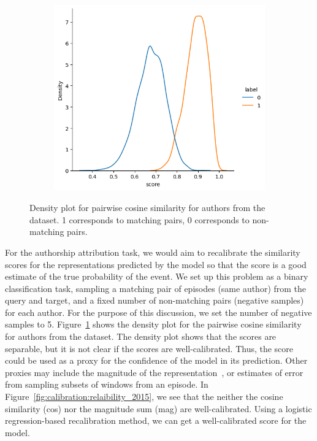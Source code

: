 \begin{figure}[h]
    \centering
    \begin{subfigure}{0.48\linewidth}
    \centering
    \includegraphics[width=\linewidth,alt={Density plot for calibration experiments.}]{stylometryExtensions/figures/calibration_expts/cos_dist_2015.png}
    \end{subfigure} %
    \caption{Density plot for pairwise cosine similarity for authors from the \DSvarydelta{} dataset. 1 corresponds to matching pairs, 0 corresponds to non-matching pairs.}
    \label{fig:calibration:density}
\end{figure}
For the authorship attribution task, we would aim to recalibrate the similarity scores for the representations predicted by the model so that the score is a good estimate of the true probability of the event.
We set up this problem as a binary classification task, sampling a matching pair of episodes (same author) from the query and target, and a fixed number of non-matching pairs (negative samples) for each author.
For the purpose of this discussion, we set the number of negative samples to 5.
Figure~\ref{fig:calibration:density} shows the density plot for the pairwise cosine similarity for authors from the \DSvarydelta{} dataset.
The density plot shows that the scores are separable, but it is not clear if the scores are well-calibrated.
Thus, the score could be used as a proxy for the confidence of the model in its prediction.
Other proxies may include the magnitude of the representation~\citep{novoselov2023investigation}, or estimates of error from sampling subsets of windows from an episode.
In Figure~\ref{fig:calibration:relaibility_2015}, we see that the neither the cosine similarity (cos) nor the magnitude sum (mag) are well-calibrated.
Using a logistic regression-based recalibration method, we can get a well-calibrated score for the model.

